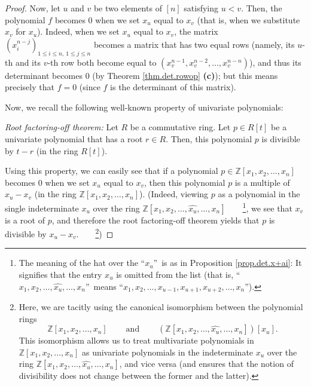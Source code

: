 \begin{proof}
Now, let $u$ and $v$ be two elements of $\left[  n\right]  $ satisfying $u<v$.
Then, the polynomial $f$ becomes $0$ when we set $x_{u}$ equal to $x_{v}$
(that is, when we substitute $x_{v}$ for $x_{u}$). Indeed, when we set $x_{u}$
equal to $x_{v}$, the matrix $\left(  x_{i}^{n-j}\right)  _{1\leq i\leq
n,\ 1\leq j\leq n}$ becomes a matrix that has two equal rows (namely, its
$u$-th and its $v$-th row both become equal to $\left(  x_{v}^{n-1}%
,x_{v}^{n-2},\ldots,x_{v}^{n-n}\right)  $), and thus its determinant becomes
$0$ (by Theorem \ref{thm.det.rowop} \textbf{(c)}); but this means precisely
that $f=0$ (since $f$ is the determinant of this matrix).

Now, we recall the following well-known property of univariate polynomials:

\begin{statement}
\textit{Root factoring-off theorem:} Let $R$ be a commutative ring. Let $p\in
R\left[  t\right]  $ be a univariate polynomial that has a root $r\in R$.
Then, this polynomial $p$ is divisible by $t-r$ (in the ring $R\left[
t\right]  $).
\end{statement}

Using this property, we can easily see that if a polynomial $p\in
\mathbb{Z}\left[  x_{1},x_{2},\ldots,x_{n}\right]  $ becomes $0$ when we set
$x_{u}$ equal to $x_{v}$, then this polynomial $p$ is a multiple of
$x_{u}-x_{v}$ (in the ring $\mathbb{Z}\left[  x_{1},x_{2},\ldots,x_{n}\right]
$). (Indeed, viewing $p$ as a polynomial in the single indeterminate $x_{u}$
over the ring $\mathbb{Z}\left[  x_{1},x_{2},\ldots,\widehat{x_{u}}%
,\ldots,x_{n}\right]  $\ \ \ \ \footnote{The meaning of the hat over the
\textquotedblleft$x_{u}$\textquotedblright\ is as in Proposition
\ref{prop.det.x+ai}: It signifies that the entry $x_{u}$ is omitted from the
list (that is, \textquotedblleft$x_{1},x_{2},\ldots,\widehat{x_{u}}%
,\ldots,x_{n}$\textquotedblright\ means \textquotedblleft$x_{1},x_{2}%
,\ldots,x_{u-1},x_{u+1},x_{u+2},\ldots,x_{n}$\textquotedblright).}, we see
that $x_{v}$ is a root of $p$, and therefore the root factoring-off theorem
yields that $p$ is divisible by $x_{u}-x_{v}$.\ \ \ \ \footnote{Here, we are
tacitly using the canonical isomorphism between the polynomial rings
\[
\mathbb{Z}\left[  x_{1},x_{2},\ldots,x_{n}\right]
\ \ \ \ \ \ \ \ \ \ \text{and}\ \ \ \ \ \ \ \ \ \ \left(  \mathbb{Z}\left[
x_{1},x_{2},\ldots,\widehat{x_{u}},\ldots,x_{n}\right]  \right)  \left[
x_{u}\right]  .
\]
This isomorphism allows us to treat multivariate polynomials in $\mathbb{Z}%
\left[  x_{1},x_{2},\ldots,x_{n}\right]  $ as univariate polynomials in the
indeterminate $x_{u}$ over the ring $\mathbb{Z}\left[  x_{1},x_{2}%
,\ldots,\widehat{x_{u}},\ldots,x_{n}\right]  $, and vice versa (and ensures
that the notion of divisibility does not change between the former and the
latter).})


\end{proof}
